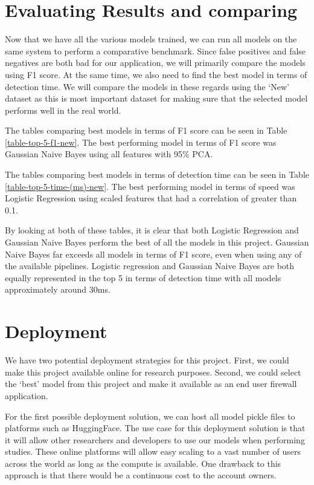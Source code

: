 \documentclass[journal]{IEEEtran}
\begin{document}
\section{Evaluating Results and comparing}

Now that we have all the various models trained, we can run all models on the same system to perform a comparative benchmark. Since false positives and false negatives are both bad for our application, we will primarily compare the models using F1 score. At the same time, we also need to find the best model in terms of detection time. We will compare the models in these regards using the `New' dataset as this is most important dataset for making sure that the selected model performs well in the real world.

The tables comparing best models in terms of F1 score can be seen in Table \ref{table-top-5-f1-new}. The best performing model in terms of F1 score was Gaussian Naive Bayes using all features with 95\% PCA.



The tables comparing best models in terms of detection time can be seen in Table \ref{table-top-5-time-(ms)-new}. The best performing model in terms of speed was Logistic Regression using scaled features that had a correlation of greater than 0.1.



By looking at both of these tables, it is clear that both Logistic Regression and Gaussian Naive Bayes perform the best of all the models in this project. Gaussian Naive Bayes far exceeds all models in terms of F1 score, even when using any of the available pipelines. Logistic regression and Gaussian Naive Bayes are both equally represented in the top 5 in terms of detection time with all models approximately around 30ms.


\section{Deployment}

We have two potential deployment strategies for this project. First, we could make this project available online for research purposes. Second, we could select the `best' model from this project and make it available as an end user firewall application.

For the first possible deployment solution, we can host all model pickle files to platforms such as HuggingFace. The use case for this deployment solution is that it will allow other researchers and developers to use our models when performing studies. These online platforms will allow easy scaling to a vast number of users across the world as long as the compute is available. One drawback to this approach is that there would be a continuous cost to the account owners.
\end{document}

